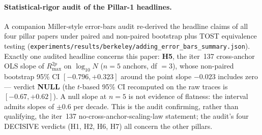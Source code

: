 \paragraph{Statistical-rigor audit of the Pillar-1 headlines.}
A companion Miller-style error-bars audit \citep{miller2024erroreval}
re-derived the headline claims of all four pillar papers under paired
and non-paired bootstrap plus TOST equivalence testing
(\texttt{experiments/results/berkeley/adding\_error\_bars\_summary.json}).
Exactly one audited headline concerns this paper: \textbf{H5}, the
iter~137 cross-anchor OLS slope of $R_{\max}^{2p}$ on $\log_{10} N$
($n = 5$ anchors, df $=3$), whose non-paired bootstrap 95\% CI
$[-0.796, +0.323]$ around the point slope $-0.023$ includes zero ---
verdict \textbf{NULL} (the $t$-based 95\% CI recomputed on the raw
traces is $[-0.67, +0.62]$).  A null slope at $n=5$ is not evidence of
flatness: the interval admits slopes of $\pm 0.6$ per decade.  This is the audit confirming, rather than
qualifying, the iter~137 no-cross-anchor-scaling-law statement; the
audit's four
DECISIVE verdicts (H1, H2, H6, H7) all concern the other pillars.
